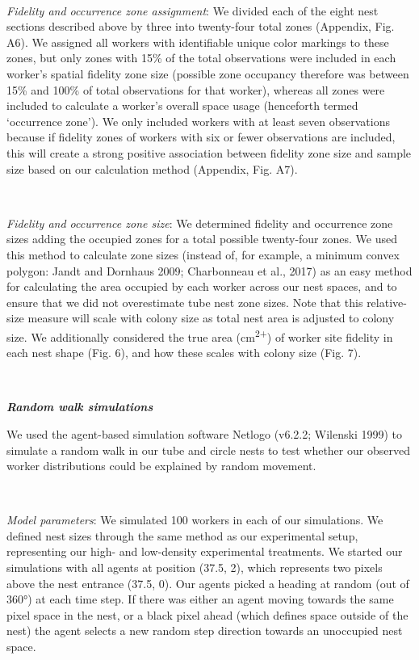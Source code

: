 \documentclass[3p]{elsarticle} %
\begin{document}
~

\emph{Fidelity and occurrence zone assignment}: We divided each of the
eight nest sections described above by three into twenty-four total
zones (Appendix, Fig. A6). We assigned all workers with identifiable
unique color markings to these zones, but only zones with 15\% of the
total observations were included in each worker's spatial fidelity zone
size (possible zone occupancy therefore was between 15\% and 100\% of
total observations for that worker), whereas all zones were included to
calculate a worker's overall space usage (henceforth termed `occurrence
zone'). We only included workers with at least seven observations
because if fidelity zones of workers with six or fewer observations are
included, this will create a strong positive association between
fidelity zone size and sample size based on our calculation method
(Appendix, Fig. A7).

~

\emph{Fidelity and occurrence zone size}: We determined fidelity and
occurrence zone sizes adding the occupied zones for a total possible
twenty-four zones. We used this method to calculate zone sizes (instead
of, for example, a minimum convex polygon: Jandt and Dornhaus 2009;
Charbonneau et al., 2017) as an easy method for calculating the area
occupied by each worker across our nest spaces, and to ensure that we
did not overestimate tube nest zone sizes. Note that this relative-size
measure will scale with colony size as total nest area is adjusted to
colony size. We additionally considered the true area
(cm\textsuperscript{2+}) of worker site fidelity in each nest shape
(Fig. 6), and how these scales with colony size (Fig. 7).

~

\textbf{\emph{Random walk simulations}}

We used the agent-based simulation software Netlogo (v6.2.2; Wilenski
1999) to simulate a random walk in our tube and circle nests to test
whether our observed worker distributions could be explained by random
movement.

~

\emph{Model parameters}: We simulated 100 workers in each of our
simulations. We defined nest sizes through the same method as our
experimental setup, representing our high- and low-density experimental
treatments. We started our simulations with all agents at position
(37.5, 2), which represents two pixels above the nest entrance (37.5,
0). Our agents picked a heading at random (out of 360°) at each time
step. If there was either an agent moving towards the same pixel space
in the nest, or a black pixel ahead (which defines space outside of the
nest) the agent selects a new random step direction towards an
unoccupied nest space.
\end{document}
